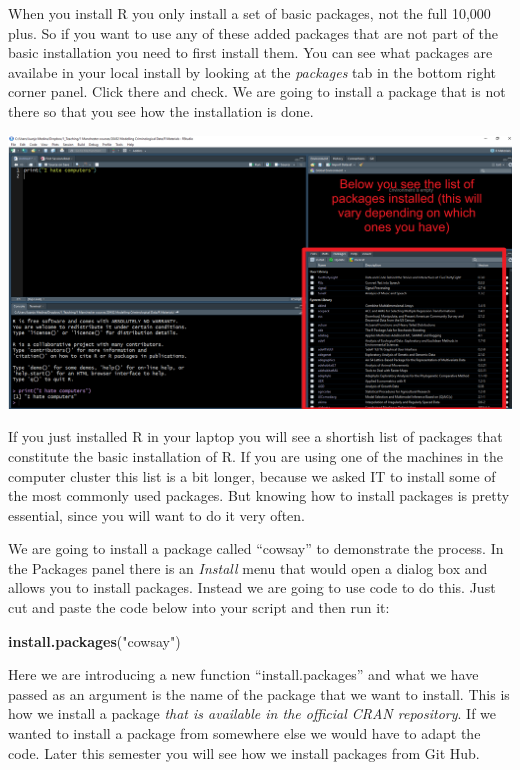 \documentclass[]{book}
\newenvironment{Shaded}{\begin{snugshade}}{\end{snugshade}}
\newcommand{\KeywordTok}[1]{\textcolor[rgb]{0.13,0.29,0.53}{\textbf{#1}}}
\newcommand{\NormalTok}[1]{#1}
\newcommand{\StringTok}[1]{\textcolor[rgb]{0.31,0.60,0.02}{#1}}
\theoremstyle{definition}
\theoremstyle{definition}
\theoremstyle{definition}
\theoremstyle{remark}
\begin{document}
When you install R you only install a set of basic packages, not the
full 10,000 plus. So if you want to use any of these added packages that
are not part of the basic installation you need to first install them.
You can see what packages are availabe in your local install by looking
at the \emph{packages} tab in the bottom right corner panel. Click there
and check. We are going to install a package that is not there so that
you see how the installation is done.

\includegraphics{imgs/packages.png}

If you just installed R in your laptop you will see a shortish list of
packages that constitute the basic installation of R. If you are using
one of the machines in the computer cluster this list is a bit longer,
because we asked IT to install some of the most commonly used packages.
But knowing how to install packages is pretty essential, since you will
want to do it very often.

We are going to install a package called ``cowsay'' to demonstrate the
process. In the Packages panel there is an \emph{Install} menu that
would open a dialog box and allows you to install packages. Instead we
are going to use code to do this. Just cut and paste the code below into
your script and then run it:

\begin{Shaded}
\begin{Highlighting}[]
\KeywordTok{install.packages}\NormalTok{(}\StringTok{"cowsay"}\NormalTok{)}
\end{Highlighting}
\end{Shaded}

Here we are introducing a new function ``install.packages'' and what we
have passed as an argument is the name of the package that we want to
install. This is how we install a package \emph{that is available in the
official CRAN repository}. If we wanted to install a package from
somewhere else we would have to adapt the code. Later this semester you
will see how we install packages from Git Hub.
\end{document}
